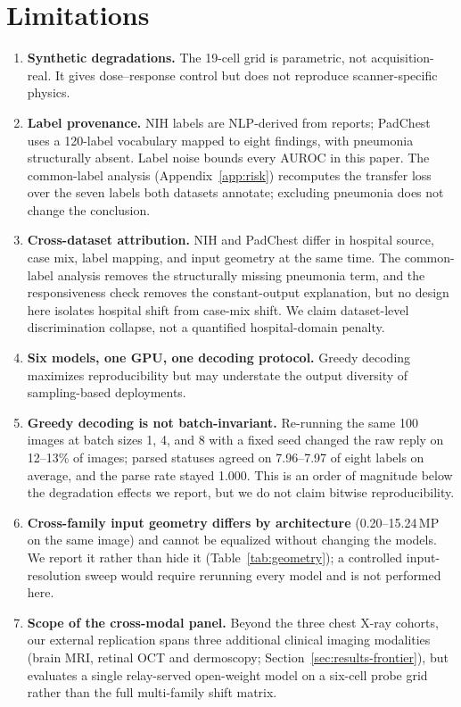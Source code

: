 \section*{Limitations}
\label{sec:limitations}

\begin{enumerate}[leftmargin=1.2em,itemsep=2pt,topsep=2pt]
\item \textbf{Synthetic degradations.} The 19-cell grid is parametric, not acquisition-real. It gives dose--response control but does not reproduce scanner-specific physics.
\item \textbf{Label provenance.} NIH labels are NLP-derived from reports; PadChest uses a 120-label vocabulary mapped to eight findings, with pneumonia structurally absent. Label noise bounds every AUROC in this paper. The common-label analysis (Appendix~\ref{app:risk}) recomputes the transfer loss over the seven labels both datasets annotate; excluding pneumonia does not change the conclusion.
\item \textbf{Cross-dataset attribution.} NIH and PadChest differ in hospital source, case mix, label mapping, and input geometry at the same time. The common-label analysis removes the structurally missing pneumonia term, and the responsiveness check removes the constant-output explanation, but no design here isolates hospital shift from case-mix shift. We claim dataset-level discrimination collapse, not a quantified hospital-domain penalty.
\item \textbf{Six models, one GPU, one decoding protocol.} Greedy decoding maximizes reproducibility but may understate the output diversity of sampling-based deployments.
\item \textbf{Greedy decoding is not batch-invariant.} Re-running the same 100 images at batch sizes 1, 4, and 8 with a fixed seed changed the raw reply on 12--13\% of images; parsed statuses agreed on 7.96--7.97 of eight labels on average, and the parse rate stayed 1.000. This is an order of magnitude below the degradation effects we report, but we do not claim bitwise reproducibility.
\item \textbf{Cross-family input geometry differs by architecture} (0.20--15.24\,MP on the same image) and cannot be equalized without changing the models. We report it rather than hide it (Table~\ref{tab:geometry}); a controlled input-resolution sweep would require rerunning every model and is not performed here.
\item \textbf{Scope of the cross-modal panel.} Beyond the three chest X-ray cohorts, our external replication spans three additional clinical imaging modalities (brain MRI, retinal OCT and dermoscopy; Section~\ref{sec:results-frontier}), but evaluates a single relay-served open-weight model on a six-cell probe grid rather than the full multi-family shift matrix.

\end{enumerate}

